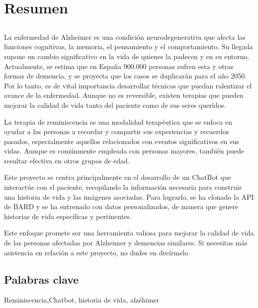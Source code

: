 \chapter*{Resumen}
\section*{\tituloPortadaVal}
La enfermedad de Alzheimer es una condición neurodegenerativa que afecta las funciones cognitivas, la memoria, el pensamiento y el comportamiento. Su llegada supone un cambio significativo en la vida de quienes la padecen y en su entorno. Actualmente, se estima que en España 900.000 personas sufren esta y otras formas de demencia, y se proyecta que los casos se duplicarán para el año 2050. Por lo tanto, es de vital importancia desarrollar técnicas que puedan ralentizar el avance de la enfermedad. Aunque no es reversible, existen terapias que pueden mejorar la calidad de vida tanto del paciente como de sus seres queridos.

La terapia de reminiscencia es una modalidad terapéutica que se enfoca en ayudar a las personas a recordar y compartir sus experiencias y recuerdos pasados, especialmente aquellos relacionados con eventos significativos en sus vidas. Aunque es comúnmente empleada con personas mayores, también puede resultar efectiva en otros grupos de edad.

Este proyecto se centra principalmente en el desarrollo de un ChatBot que interactúe con el paciente, recopilando la información necesaria para construir una historia de vida y las imágenes asociadas. Para lograrlo, se ha clonado la API de BARD y se ha entrenado con datos personalizados, de manera que genere historias de vida específicas y pertinentes.

Este enfoque promete ser una herramienta valiosa para mejorar la calidad de vida de las personas afectadas por Alzheimer y demencias similares. Si necesitas más asistencia en relación a este proyecto, no dudes en decírmelo. 





\section*{Palabras clave}
   
\noindent Reminiscencia,Chatbot, historia de vida, alzéhimer

   


